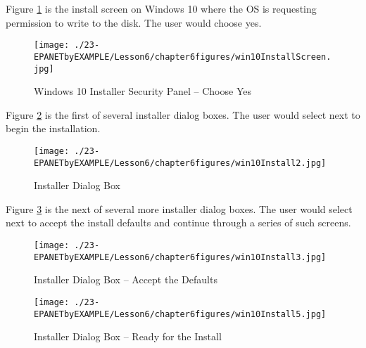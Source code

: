 Figure \ref{fig:win10InstallScreen} is the install screen on Windows 10 where the OS is requesting permission to write to the disk.  The user would choose yes.

\begin{figure}[htbp] %
   \centering
   \texttt{[image: ./23-EPANETbyEXAMPLE/Lesson6/chapter6figures/win10InstallScreen.jpg]} 
   \caption{Windows 10 Installer Security Panel -- Choose Yes}
   \label{fig:win10InstallScreen}
\end{figure}
\clearpage

Figure \ref{fig:win10Install2} is the first of several installer dialog boxes.  The user would select next to begin the installation.

\begin{figure}[h!] %
   \centering
   \texttt{[image: ./23-EPANETbyEXAMPLE/Lesson6/chapter6figures/win10Install2.jpg]} 
   \caption{Installer Dialog Box}
   \label{fig:win10Install2}
\end{figure}

Figure \ref{fig:win10Install3} is the next of several more installer dialog boxes.  The user would select next to accept the install defaults and continue through a series of such screens.

\begin{figure}[h!] %
   \centering
   \texttt{[image: ./23-EPANETbyEXAMPLE/Lesson6/chapter6figures/win10Install3.jpg]} 
   \caption{Installer Dialog Box -- Accept the Defaults}
   \label{fig:win10Install3}
\end{figure}

\clearpage

\begin{figure}[h!] %
   \centering
   \texttt{[image: ./23-EPANETbyEXAMPLE/Lesson6/chapter6figures/win10Install5.jpg]} 
   \caption{Installer Dialog Box -- Ready for the Install}
   \label{fig:win10Install5}
\end{figure}

